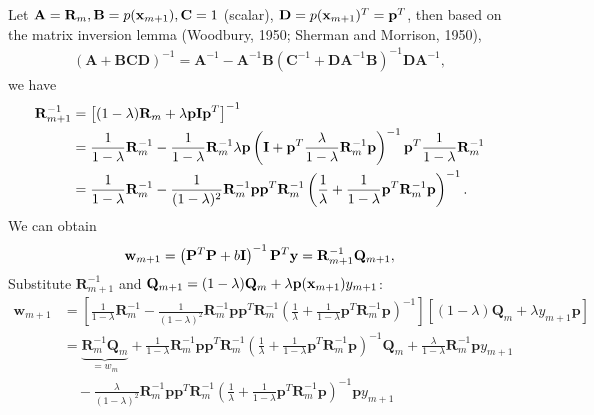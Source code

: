 Let \( \mathbf{A} = \mathbf{R}_m, \mathbf{B} = p({\mathbf{x}}_{m+1}), \mathbf{C} = 1 \) (scalar), \( \mathbf{D} = p({\mathbf{x}}_{m+1})^T = \mathbf{p}^T \), then based on the matrix inversion lemma (Woodbury, 1950; Sherman and Morrison, 1950),
\begin{align*}
	(\mathbf{A} + \mathbf{BCD})^{-1} = \mathbf{A}^{-1} - \mathbf{A}^{-1} \mathbf{B} (\mathbf{C}^{-1} + \mathbf{DA}^{-1} \mathbf{B})^{-1} \mathbf{DA}^{-1},
\end{align*}
we have
\begin{align*}
	\mathbf{R}_{m+1}^{-1} &= \left[ (1 - \lambda) \mathbf{R}_m + \lambda \mathbf{p}\mathbf{I}{\mathbf{p}}^T \right]^{-1}\\
						  &= \frac{1}{1 - \lambda} \mathbf{R}_m^{-1} - \frac{1}{1 - \lambda} \mathbf{R}_m^{-1}\lambda \mathbf{p} \left( \mathbf{I} + \mathbf{p}^T \frac{\lambda}{1-\lambda} \mathbf{R}_m^{-1} \mathbf{p} \right)^{-1} \mathbf{p}^T \frac{1}{1-\lambda} \mathbf{R}_m^{-1}\\
						  &= \frac{1}{1 - \lambda} \mathbf{R}_m^{-1} - \frac{1}{(1 - \lambda)^2} \mathbf{R}_m^{-1} \mathbf{pp}^T \mathbf{R}_m^{-1} \left( \frac{1}{\lambda} + \frac{1}{1-\lambda} \mathbf{p}^T \mathbf{R}_m^{-1} \mathbf{p} \right)^{-1}.
\end{align*}
We can obtain
\begin{align*}
	{\mathbf{w}}_{m+1} = \left( \mathbf{P}^T \mathbf{P} + b\mathbf{I} \right)^{-1} \mathbf{P}^T \mathbf{y} = \mathbf{R}_{m+1}^{-1} \mathbf{Q}_{m+1},
\end{align*}
Substitute \(\mathbf{R}_{m+1}^{-1}\) and \(\mathbf{Q}_{m+1} = (1 - \lambda) \mathbf{Q}_m +  \lambda\mathbf{p}({\mathbf{x}}_{m+1}) y_{m+1}\):
\begin{align*}
	\mathbf{w}_{m+1} &= \left[ \frac{1}{1 - \lambda} \mathbf{R}_m^{-1} - \frac{1}{(1 - \lambda)^2} \mathbf{R}_m^{-1} \mathbf{p}\mathbf{p}^T \mathbf{R}_m^{-1} \left( \frac{1}{\lambda} + \frac{1}{1 - \lambda} \mathbf{p}^T \mathbf{R}_m^{-1} \mathbf{p} \right)^{-1} \right] \left[ (1 - \lambda) \mathbf{Q}_m + \lambda y_{m+1} \mathbf{p} \right]\\
					 &= \underbrace{\mathbf{R}_m^{-1} \mathbf{Q}_m}_{=w_m} + \frac{1}{1 - \lambda}\mathbf{R}_m^{-1} \mathbf{p}\mathbf{p}^T \mathbf{R}_m^{-1} \left( \frac{1}{\lambda} + \frac{1}{1 - \lambda} \mathbf{p}^T \mathbf{R}_m^{-1} \mathbf{p} \right)^{-1} \mathbf{Q}_m + \frac{\lambda}{1 - \lambda} \mathbf{R}_m^{-1} \mathbf{p} y_{m+1} \\
					 &\quad - \frac{\lambda}{(1 - \lambda)^2}\mathbf{R}_m^{-1} \mathbf{p}\mathbf{p}^T \mathbf{R}_m^{-1} \left( \frac{1}{\lambda} + \frac{1}{1 - \lambda} \mathbf{p}^T \mathbf{R}_m^{-1} \mathbf{p} \right)^{-1}\mathbf{p} y_{m+1}\\
\end{align*}
